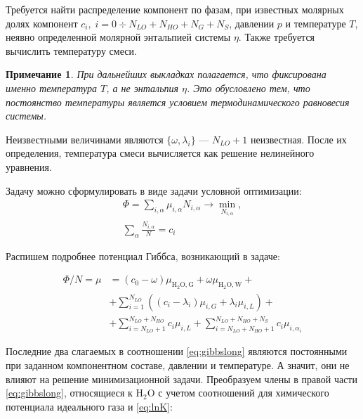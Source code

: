 \documentclass[12pt]{article}
\let\dividesymbol\div
\renewcommand{\div}{\operatorname{div}}
\newtheorem{note}{Примечание}[section]
\begin{document}
Требуется найти распределение компонент по фазам, при известных молярных долях компонент $c_i, \; i = 0 \dividesymbol N_{LO} + N_{HO} + N_{G} + N_{S}$, давлении $p$ и температуре $T$, неявно определенной молярной энтальпией системы $\eta$. Также требуется вычислить температуру смеси.

\begin{note}
При дальнейших выкладках полагается, что фиксирована именно температура $T$, а не энтальпия $\eta$. Это обусловлено тем, что постоянство температуры является условием термодинамического равновесия системы.
\end{note}

Неизвестными величинами являются $\{\omega, \lambda_i\}$ --- $N_{LO} + 1$ неизвестная. После их определения, температура смеси вычисляется как решение нелинейного уравнения.

Задачу можно сформулировать в виде задачи условной оптимизации:
\begin{equation}
\begin{aligned}
\Phi = \sum_{i, \alpha} \mu_{i, \alpha} N_{i, \alpha} \rightarrow \min_{N_{i, \alpha}},\\
\sum_\alpha \frac{N_{i, \alpha}}{N} = c_i
\end{aligned}
\label{eq:problem}
\end{equation}

Распишем подробнее потенциал Гиббса, возникающий в задаче:

\begin{equation}
\begin{aligned}
\Phi / N = \mu &= (c_0 - \omega) \mu_{\mathrm{H_2O, G}} + \omega \mu_{\mathrm{H_2O, W}} + \\
& + \sum_{i = 1}^{N_{LO}} \left((c_i - \lambda_i) \mu_{i, G} + \lambda_i \mu_{i, L}\right) + \\
& + \sum_{i = N_{LO} + 1}^{N_{LO} + N_{HO}} c_i \mu_{i, L} + \sum_{i = N_{LO} + N_{HO}+ 1}^{N_{LO} + N_{HO} + N_{S}} c_i \mu_{i, \alpha_i}
\end{aligned}
\label{eq:gibbslong}
\end{equation}

Последние два слагаемых в соотношении \eqref{eq:gibbslong} являются постоянными при заданном компонентном составе, давлении и температуре. А значит, они не влияют на решение минимизационной задачи. Преобразуем члены в правой части \eqref{eq:gibbslong}, относящиеся к $\mathrm{H_2O}$ с учетом соотношений для химического потенциала идеального газа и \eqref{eq:lnK}:
\end{document}
